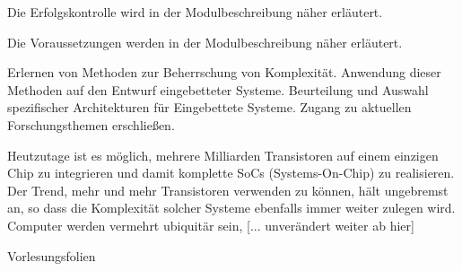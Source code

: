 \begin{course}

\setdoclanguagegerman
{}



\coursehead


\label{cour_7229.dp_997}


\begin{styleenv}
\begin{assessment}
Die Erfolgskontrolle wird in der Modulbeschreibung näher erläutert.


\end{assessment}

\begin{conditions}Die Voraussetzungen werden in der Modulbeschreibung näher erläutert.

\end{conditions}


\end{styleenv}

\begin{learningoutcomes}
Erlernen von Methoden zur Beherrschung von Komplexität. \newline
Anwendung dieser Methoden auf den Entwurf eingebetteter Systeme.\newline
Beurteilung und Auswahl spezifischer Architekturen für Eingebettete Systeme.\newline
Zugang zu aktuellen Forschungsthemen erschließen.


\end{learningoutcomes}

\begin{content}
Heutzutage ist es möglich, mehrere Milliarden Transistoren auf einem einzigen Chip zu integrieren und damit komplette SoCs (Systems-On-Chip) zu realisieren. Der Trend, mehr und mehr Transistoren verwenden zu können, hält ungebremst an, so dass die Komplexität solcher Systeme ebenfalls immer weiter zulegen wird. Computer werden vermehrt ubiquitär sein, [... unverändert weiter ab hier]


\end{content}

\begin{media}Vorlesungsfolien

\end{media}





\end{course}